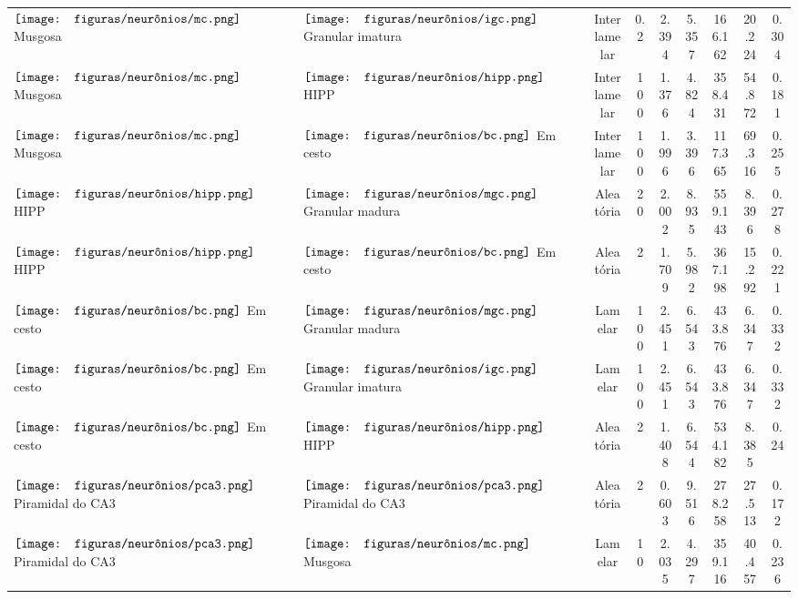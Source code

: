 \begin{table}[h!]
{\begin{tabular}{llccccccc}
$\vcenter{\hbox{\texttt{[image: figuras/neurônios/mc.png]}}}$ Musgosa & $\vcenter{\hbox{\texttt{[image: figuras/neurônios/igc.png]}}}$ Granular imatura & Interlamelar & 0.2 & 2.394 & 5.357 & 166.162 & 20.224 & 0.304 \\
$\vcenter{\hbox{\texttt{[image: figuras/neurônios/mc.png]}}}$ Musgosa & $\vcenter{\hbox{\texttt{[image: figuras/neurônios/hipp.png]}}}$ HIPP & Interlamelar & 100 & 1.376 & 4.824 & 358.431 & 54.872 & 0.181 \\
$\vcenter{\hbox{\texttt{[image: figuras/neurônios/mc.png]}}}$ Musgosa & $\vcenter{\hbox{\texttt{[image: figuras/neurônios/bc.png]}}}$ Em cesto & Interlamelar & 100 & 1.996 & 3.396 & 117.365 & 69.316 & 0.255 \\
$\vcenter{\hbox{\texttt{[image: figuras/neurônios/hipp.png]}}}$ HIPP & $\vcenter{\hbox{\texttt{[image: figuras/neurônios/mgc.png]}}}$ Granular madura & Aleatória & 20 & 2.002 & 8.935 & 559.143 & 8.396 & 0.278 \\
$\vcenter{\hbox{\texttt{[image: figuras/neurônios/hipp.png]}}}$ HIPP & $\vcenter{\hbox{\texttt{[image: figuras/neurônios/bc.png]}}}$ Em cesto & Aleatória & 2 & 1.709 & 5.982 & 367.198 & 15.292 & 0.221 \\
$\vcenter{\hbox{\texttt{[image: figuras/neurônios/bc.png]}}}$ Em cesto & $\vcenter{\hbox{\texttt{[image: figuras/neurônios/mgc.png]}}}$ Granular madura & Lamelar & 100 & 2.451 & 6.543 & 433.876 & 6.347 & 0.332 \\
$\vcenter{\hbox{\texttt{[image: figuras/neurônios/bc.png]}}}$ Em cesto & $\vcenter{\hbox{\texttt{[image: figuras/neurônios/igc.png]}}}$ Granular imatura & Lamelar & 100 & 2.451 & 6.543 & 433.876 & 6.347 & 0.332 \\
$\vcenter{\hbox{\texttt{[image: figuras/neurônios/bc.png]}}}$ Em cesto & $\vcenter{\hbox{\texttt{[image: figuras/neurônios/hipp.png]}}}$ HIPP & Aleatória & 2 & 1.408 & 6.544 & 534.182 & 8.385 & 0.24 \\
$\vcenter{\hbox{\texttt{[image: figuras/neurônios/pca3.png]}}}$ Piramidal do CA3 & $\vcenter{\hbox{\texttt{[image: figuras/neurônios/pca3.png]}}}$ Piramidal do CA3 & Aleatória & 2 & 0.603 & 9.516 & 278.258 & 27.513 & 0.172 \\
$\vcenter{\hbox{\texttt{[image: figuras/neurônios/pca3.png]}}}$ Piramidal do CA3 & $\vcenter{\hbox{\texttt{[image: figuras/neurônios/mc.png]}}}$ Musgosa & Lamelar & 10 & 2.035 & 4.297 & 359.116 & 40.457 & 0.236 \\

\end{tabular}}
\end{table}
